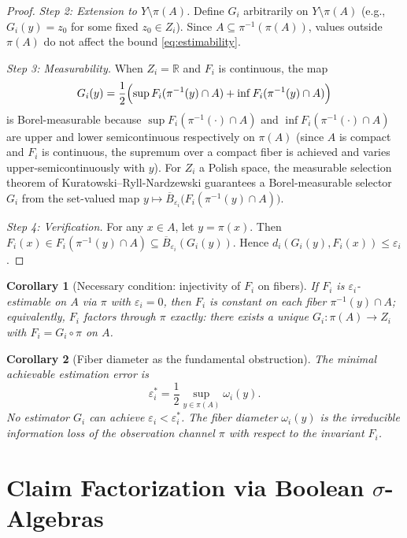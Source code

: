 \documentclass[11pt]{article}
\newtheorem{corollary}{Corollary}
\begin{document}
\begin{proof}
\emph{Step 2: Extension to $Y\setminus\pi(A)$.} Define $G_i$ arbitrarily on $Y\setminus\pi(A)$ (e.g., $G_i(y)=z_0$ for some fixed $z_0\in Z_i$). Since $A\subseteq\pi^{-1}(\pi(A))$, values outside $\pi(A)$ do not affect the bound \eqref{eq:estimability}.

\emph{Step 3: Measurability.} When $Z_i=\mathbb{R}$ and $F_i$ is continuous, the map
\[
G_i(y)=\frac{1}{2}\Bigl(\sup F_i(\pi^{-1}(y)\cap A)+\inf F_i(\pi^{-1}(y)\cap A)\Bigr)
\]
is Borel-measurable because $\sup F_i(\pi^{-1}(\cdot)\cap A)$ and $\inf F_i(\pi^{-1}(\cdot)\cap A)$ are upper and lower semicontinuous respectively on $\pi(A)$ (since $A$ is compact and $F_i$ is continuous, the supremum over a compact fiber is achieved and varies upper-semicontinuously with $y$). For $Z_i$ a Polish space, the measurable selection theorem of Kuratowski--Ryll-Nardzewski guarantees a Borel-measurable selector $G_i$ from the set-valued map $y\mapsto\overline{B}_{\varepsilon_i}\bigl(F_i(\pi^{-1}(y)\cap A)\bigr)$.

\emph{Step 4: Verification.} For any $x\in A$, let $y=\pi(x)$. Then $F_i(x)\in F_i(\pi^{-1}(y)\cap A)\subseteq\overline{B}_{\varepsilon_i}(G_i(y))$. Hence $d_i(G_i(y),F_i(x))\leq\varepsilon_i$.\qedhere
\end{proof}

\begin{corollary}[Necessary condition: injectivity of $F_i$ on fibers]
If $F_i$ is $\varepsilon_i$-estimable on $A$ via $\pi$ with $\varepsilon_i=0$, then $F_i$ is constant on each fiber $\pi^{-1}(y)\cap A$; equivalently, $F_i$ factors through $\pi$ exactly: there exists a unique $G_i\colon\pi(A)\to Z_i$ with $F_i=G_i\circ\pi$ on $A$.
\end{corollary}

\begin{corollary}[Fiber diameter as the fundamental obstruction]
The minimal achievable estimation error is
\[
\varepsilon_i^{*}=\frac{1}{2}\sup_{y\in\pi(A)}\omega_i(y).
\]
No estimator $G_i$ can achieve $\varepsilon_i<\varepsilon_i^{*}$. The fiber diameter $\omega_i(y)$ is the irreducible information loss of the observation channel $\pi$ with respect to the invariant $F_i$.
\end{corollary}

\section{Claim Factorization via Boolean $\sigma$-Algebras}
\label{sec:factorization}
\end{document}
